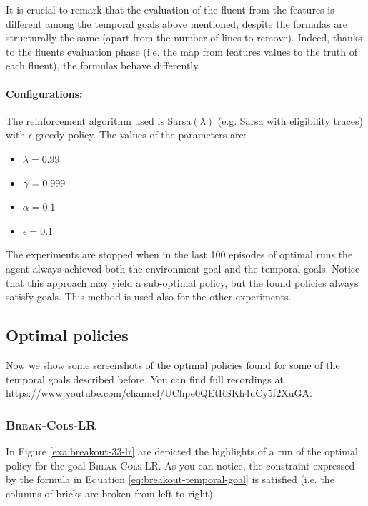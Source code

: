 It is crucial to remark that the evaluation of the fluent from the features is different among the temporal goals above mentioned, despite the formulas are structurally the same (apart from the number of lines to remove). Indeed, thanks to the fluents evaluation phase (i.e. the map from features values to the truth of each fluent), the formulas behave differently.

\paragraph{Configurations:}
The reinforcement algorithm used is Sarsa$(\lambda)$ (e.g. Sarsa with eligibility traces) with $\epsilon$-greedy policy. The values of the parameters are:
\begin{itemize}
	 \item $\lambda = 0.99$
	 \item $\gamma=0.999$	
	 \item $\alpha=0.1$
	 \item $\epsilon= 0.1$
\end{itemize}

The experiments are stopped when in the last 100 episodes of optimal runs the agent always achieved both the environment goal and the temporal goals.
Notice that this approach may yield a sub-optimal policy, but the found policies always satisfy \LLf goals. This method is used also for the other experiments.

\subsection{Optimal policies}
Now we show some screenshots of the optimal policies found for some of the temporal goals described before. You can find full recordings at \url{https://www.youtube.com/channel/UChpe0QEtRSKh4uCy5f2XuGA}.

\subsubsection{\textsc{Break-Cols-LR}}
In Figure \ref{exa:breakout-33-lr} are depicted the highlights of a run of the optimal policy for the goal \textsc{Break-Cols-LR}. As you can notice, the constraint expressed by the formula in Equation \ref{eq:breakout-temporal-goal} is satisfied (i.e. the columns of bricks are broken from left to right).


